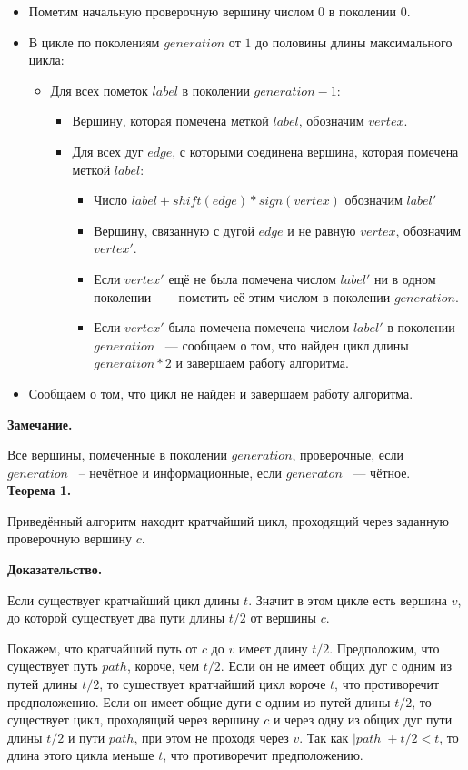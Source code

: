\documentclass[14pt]{mmcs-article}
\begin{document}
\begin{itemize}
\item Пометим начальную проверочную вершину числом $0$ в поколении $0$.
\item В цикле по поколениям $generation$ от $1$ до половины длины максимального цикла:
  \begin{itemize}
  \item Для всех пометок $label$ в поколении $generation - 1$:
    \begin{itemize}
    \item Вершину, которая помечена меткой $label$, обозначим $vertex$.
    \item Для всех дуг $edge$, с которыми соединена вершина, которая помечена меткой $label$:
      \begin{itemize}
      \item Число $label + shift(edge) * sign(vertex)$ обозначим $label'$
      \item Вершину, связанную с дугой $edge$ и не равную $vertex$, обозначим $vertex'$.
      \item Если $vertex'$ ещё не была помечена числом $label'$ ни в одном поколении ~--- пометить её этим числом в поколении $generation$.
      \item Если $vertex'$ была помечена помечена числом  $label'$ в поколении $generation$ ~--- сообщаем о том, что найден цикл длины $generation * 2$ и завершаем работу алгоритма.
      \end{itemize}
    \end{itemize}
  \end{itemize}
  \item Сообщаем о том, что цикл не найден и завершаем работу алгоритма.
\end{itemize}

\textbf{Замечание.}

Все вершины, помеченные в поколении $generation$, проверочные, если $generation$ ~-- нечётное и информационные, если $generaton$ ~--- чётное.
\\

\textbf{Теорема 1.}

Приведённый алгоритм находит кратчайший цикл, проходящий через заданную проверочную вершину $c$.

\textbf{Доказательство.}

Если существует кратчайший цикл длины $t$. Значит в этом цикле есть вершина $v$, до которой существует два пути длины $t / 2$ от вершины $c$. 

Покажем, что кратчайший путь от $c$ до $v$ имеет длину $t / 2$.  Предположим, что существует путь $path$, короче, чем $t / 2$. Если он не имеет общих дуг с одним из путей длины $t / 2$, то существует кратчайший цикл короче $t$, что противоречит предположению. Если он имеет общие дуги с одним из путей длины $t / 2$, то существует цикл, проходящий через вершину $c$ и через одну из общих дуг пути длины $t / 2$ и пути $path$, при этом не проходя через $v$. Так как $|path| + t / 2 < t$, то длина этого цикла меньше $t$, что противоречит предположению.
\end{document}
